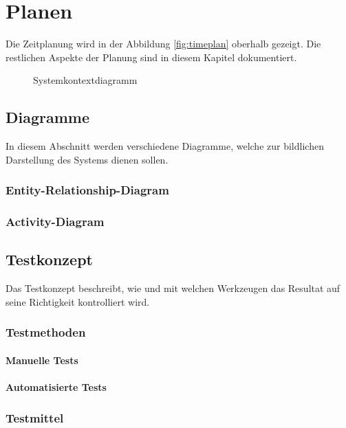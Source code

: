 \chapter{Planen}

Die Zeitplanung wird in der Abbildung \ref{fig:timeplan} oberhalb gezeigt. Die restlichen Aspekte der Planung sind in diesem Kapitel dokumentiert.

\begin{figure}[H]
  \begin{center}
  \end{center}
  \caption[\enquote{Systemkontextdiagramm} erstellt mit Tikz UML]{Systemkontextdiagramm}
  \label{fig:systemcontext}
\end{figure}

\section{Diagramme}
In diesem Abschnitt werden verschiedene Diagramme, welche zur bildlichen Darstellung des Systems dienen sollen.
\subsection{Entity-Relationship-Diagram}
\subsection{Activity-Diagram}

\section{Testkonzept}
\label{sec:testkonzept}
Das Testkonzept beschreibt, wie und mit welchen Werkzeugen das Resultat auf seine Richtigkeit kontrolliert wird.

\subsection{Testmethoden}
\subsubsection{Manuelle Tests}
\subsubsection{Automatisierte Tests}

\subsection{Testmittel}
